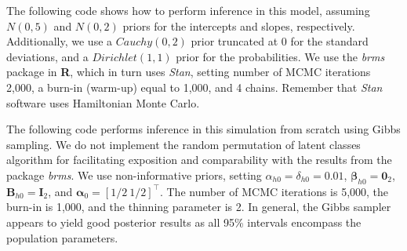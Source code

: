 The following code shows how to perform inference in this model, assuming $N(0,5)$ and $N(0,2)$ priors for the intercepts and slopes, respectively. Additionally, we use a $Cauchy(0,2)$ prior truncated at 0 for the standard deviations, and a $Dirichlet(1,1)$ prior for the probabilities. We use the \textit{brms} package in \textbf{R}, which in turn uses \textit{Stan}, setting number of MCMC iterations 2,000, a burn-in (warm-up) equal to 1,000, and 4 chains. Remember that \textit{Stan} software uses Hamiltonian Monte Carlo.

The following code performs inference in this simulation from scratch using Gibbs sampling. We do not implement the random permutation of latent classes algorithm for facilitating exposition and comparability with the results from the package \textit{brms}. We use non-informative priors, setting $\alpha_{h0}=\delta_{h0}=0.01$, $\boldsymbol{\beta}_{h0}=\boldsymbol{0}_2$, $\boldsymbol{B}_{h0}=\boldsymbol{I}_2$, and $\boldsymbol{\alpha}_0=[1/2 \ 1/2]^{\top}$. The number of MCMC iterations is 5,000, the burn-in is 1,000, and the thinning parameter is 2. In general, the Gibbs sampler appears to yield good posterior results as all 95\% intervals encompass the population parameters. 

